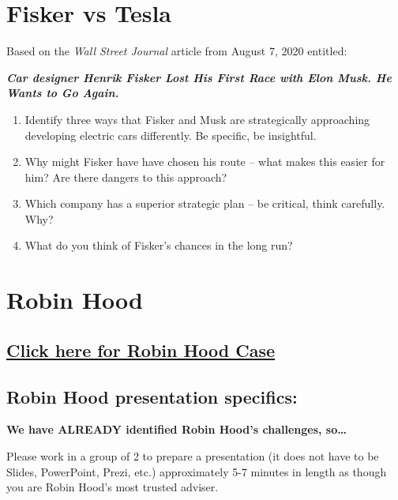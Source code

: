 \documentclass[
]{book}
\providecommand{\tightlist}{%
  \setlength{\itemsep}{0pt}\setlength{\parskip}{0pt}}
\begin{document}
\hypertarget{fisker-vs-tesla}{%
\chapter{Fisker vs Tesla}\label{fisker-vs-tesla}}

Based on the \emph{Wall Street Journal} article from August 7, 2020 entitled:

\textbf{\emph{Car designer Henrik Fisker Lost His First Race with Elon Musk. He Wants to Go Again.}}

\begin{enumerate}
\def\labelenumi{\arabic{enumi}.}
\tightlist
\item
  Identify three ways that Fisker and Musk are strategically approaching developing electric cars differently. Be specific, be insightful.
\item
  Why might Fisker have have chosen his route -- what makes this easier for him? Are there dangers to this approach?
\item
  Which company has a superior strategic plan -- be critical, think carefully. Why?
\item
  What do you think of Fisker's chances in the long run?
\end{enumerate}

\hypertarget{robin-hood}{%
\chapter{Robin Hood}\label{robin-hood}}

\hypertarget{click-here-for-robin-hood-case}{%
\section{\texorpdfstring{\href{https://nanopdf.com/download/robin-hood-case-salem-state-university_pdf}{Click here for Robin Hood Case}}{Click here for Robin Hood Case}}\label{click-here-for-robin-hood-case}}

\hypertarget{robin-hood-presentation-specifics}{%
\section{Robin Hood presentation specifics:}\label{robin-hood-presentation-specifics}}

\textbf{We have ALREADY identified Robin Hood's challenges, so\ldots{}}

Please work in a group of 2 to prepare a presentation (it does not have to be Slides, PowerPoint, Prezi, etc.) approximately 5-7 minutes in length as though you are Robin Hood's most trusted adviser.
\end{document}
